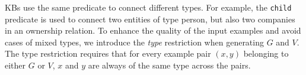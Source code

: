 \vspace{1ex}
KBs use the same predicate to connect different types. For example, the \texttt{child} predicate is used to connect two entities of type person, but also two companies in an ownership relation. To enhance the quality of the input examples and avoid cases of mixed types, we introduce the \emph{type} restriction when generating $G$ and $V$. The type restriction requires that for every example pair $(x,y)$ belonging to either $G$ or $V$, $x$ and $y$ are always of the same type across the pairs. 



